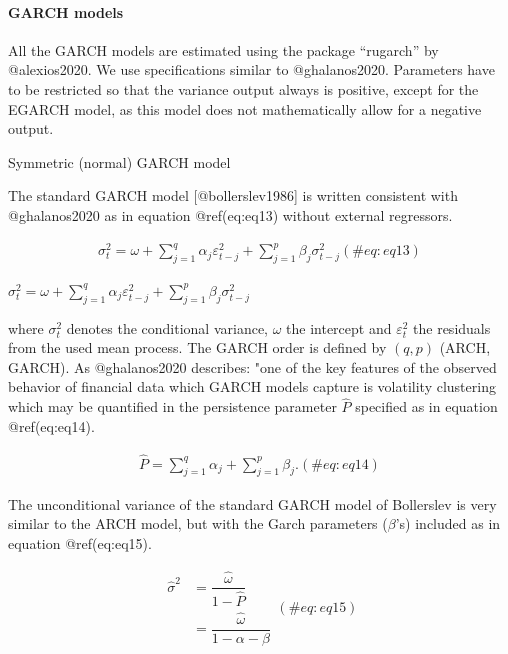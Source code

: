 \documentclass[
]{article}
\begin{document}
\hypertarget{garch-models}{%
\paragraph{GARCH models}\label{garch-models}}

All the GARCH models are estimated using the package ``rugarch'' by
@alexios2020. We use specifications similar to @ghalanos2020. Parameters
have to be restricted so that the variance output always is positive,
except for the EGARCH model, as this model does not mathematically allow
for a negative output.

Symmetric (normal) GARCH model

\noindent The standard GARCH model {[}@bollerslev1986{]} is written
consistent with @ghalanos2020 as in equation @ref(eq:eq13) without
external regressors.

\begin{align}
\sigma_t^2 = \omega  + \sum\limits_{j = 1}^q {{\alpha_j}\varepsilon _{t-j}^2 +} \sum\limits_{j=1}^p {{\beta_j}\sigma_{t-j}^2} 
 (\#eq:eq13)
\end{align}

\(\sigma_t^2 = \omega + \sum\limits_{j = 1}^q {{\alpha_j}\varepsilon _{t-j}^2 +} \sum\limits_{j=1}^p {{\beta_j}\sigma_{t-j}^2}\)

\noindent where \(\sigma_t^2\) denotes the conditional variance,
\(\omega\) the intercept and \(\varepsilon_t^2\) the residuals from the
used mean process. The GARCH order is defined by \((q, p)\) (ARCH,
GARCH). As @ghalanos2020 describes: "one of the key features of the
observed behavior of financial data which GARCH models capture is
volatility clustering which may be quantified in the persistence
parameter \(\hat{P}\) specified as in equation @ref(eq:eq14).

\begin{align}
\hat{P} = \sum\limits_{j = 1}^q {{\alpha_j}}  + \sum\limits_{j = 1}^p {{\beta_j}}.
 (\#eq:eq14)
\end{align}

\noindent The unconditional variance of the standard GARCH model of
Bollerslev is very similar to the ARCH model, but with the Garch
parameters (\(\beta\)'s) included as in equation @ref(eq:eq15).

\begin{equation}
\begin{split}
\hat{\sigma}^2 
&= \dfrac{\hat{\omega}}{1 - \hat{P}} \\
&= \dfrac{\hat{\omega}}{1 - \alpha - \beta}
\end{split}
 (\#eq:eq15)
\end{equation}
\end{document}
